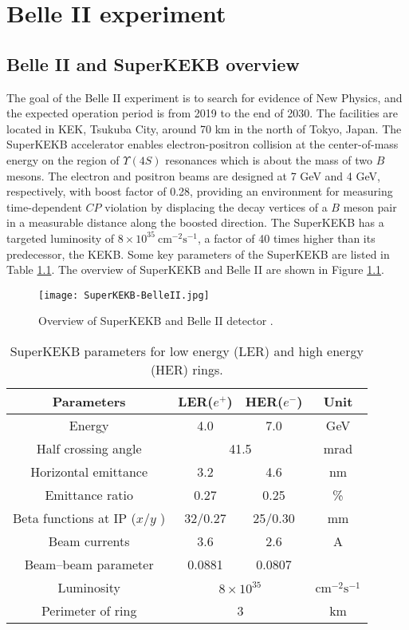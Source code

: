 \chapter{Belle II experiment}
\section{Belle II and SuperKEKB overview}
The goal of the Belle II experiment is to search for evidence of New Physics, and the expected operation period is from 2019 to the end of 2030. The facilities are located in KEK, Tsukuba City, around 70 km in the north of Tokyo, Japan. The SuperKEKB accelerator enables electron-positron collision at the center-of-mass energy on the region of $\Upsilon(4S)$ resonances which is about the mass of two $B$ mesons. The electron and positron beams are designed at 7 GeV and 4 GeV, respectively, with boost factor of 0.28, providing an environment for measuring time-dependent $CP$ violation by displacing the decay vertices of a $B$ meson pair in a measurable distance along the boosted direction. The SuperKEKB has a targeted luminosity of $8\times 10^{35}\: \text{cm}^{-2} \text{s}^{-1}$, a factor of 40 times higher than its predecessor, the KEKB.  Some key parameters of the SuperKEKB are listed in Table \ref{tab:superkekb_pars}. The overview of SuperKEKB and Belle II are shown in Figure \ref{fig:superkekb_belle2}.

\begin{figure}
	\centering 
	\texttt{[image: SuperKEKB-BelleII.jpg]}
	\caption{Overview of SuperKEKB and Belle II detector \cite{Abe:2010gxa}.}
	\label{fig:superkekb_belle2}
\end{figure}

\begin{table}[H]
	\centering
	\large
	\caption{SuperKEKB parameters for low energy (LER) and high energy (HER) rings.\cite{b2book}}
	\label{tab:superkekb_pars}
	\begin{tabular}{c c c c}
		\toprule
		
		Parameters & LER($e^+$) & HER($e^-$) & Unit\\
		\hline
		Energy & 4.0 & 7.0 & GeV\\
		Half crossing angle & \multicolumn{2}{c}{41.5} & mrad\\
		Horizontal emittance & 3.2 & 4.6 & nm \\
		Emittance ratio & 0.27 & 0.25 & \%\\
		Beta functions at IP ($x$/$y$ ) & 32/0.27 & 25/0.30 & mm\\
		Beam currents & 3.6 & 2.6 &  A \\
		Beam–beam parameter & 0.0881 & 0.0807 & {}\\
		Luminosity & \multicolumn{2}{c}{$8\times 10^{35}$} &  $\text{cm}^{-2} \text{s}^{-1}$\\
		Perimeter of ring & \multicolumn{2}{c}{3} & km\\
		
		\bottomrule
	\end{tabular}
\end{table}


